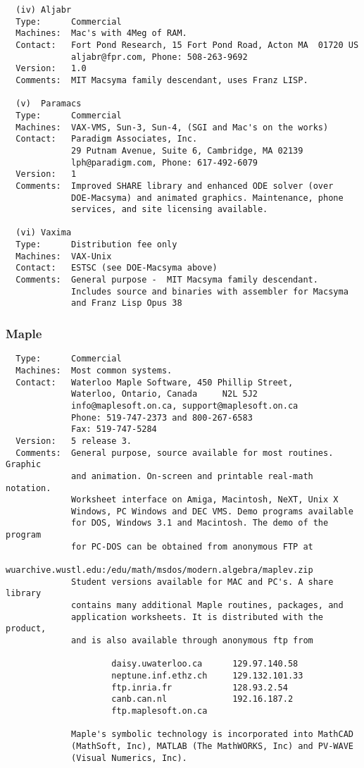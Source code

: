 \begin{verbatim}
  (iv) Aljabr
  Type:      Commercial
  Machines:  Mac's with 4Meg of RAM.
  Contact:   Fort Pond Research, 15 Fort Pond Road, Acton MA  01720 US
             aljabr@fpr.com, Phone: 508-263-9692
  Version:   1.0
  Comments:  MIT Macsyma family descendant, uses Franz LISP.

  (v)  Paramacs
  Type:      Commercial
  Machines:  VAX-VMS, Sun-3, Sun-4, (SGI and Mac's on the works)
  Contact:   Paradigm Associates, Inc.
             29 Putnam Avenue, Suite 6, Cambridge, MA 02139
             lph@paradigm.com, Phone: 617-492-6079
  Version:   1
  Comments:  Improved SHARE library and enhanced ODE solver (over
             DOE-Macsyma) and animated graphics. Maintenance, phone
             services, and site licensing available.

  (vi) Vaxima
  Type:      Distribution fee only
  Machines:  VAX-Unix
  Contact:   ESTSC (see DOE-Macsyma above)
  Comments:  General purpose -  MIT Macsyma family descendant.
             Includes source and binaries with assembler for Macsyma
             and Franz Lisp Opus 38
\end{verbatim}

\subsubsection{Maple}
\begin{verbatim}
  Type:      Commercial
  Machines:  Most common systems.
  Contact:   Waterloo Maple Software, 450 Phillip Street,
             Waterloo, Ontario, Canada     N2L 5J2
             info@maplesoft.on.ca, support@maplesoft.on.ca
             Phone: 519-747-2373 and 800-267-6583
             Fax: 519-747-5284
  Version:   5 release 3.
  Comments:  General purpose, source available for most routines. Graphic
             and animation. On-screen and printable real-math notation.
             Worksheet interface on Amiga, Macintosh, NeXT, Unix X
             Windows, PC Windows and DEC VMS. Demo programs available
             for DOS, Windows 3.1 and Macintosh. The demo of the program
             for PC-DOS can be obtained from anonymous FTP at
             wuarchive.wustl.edu:/edu/math/msdos/modern.algebra/maplev.zip
             Student versions available for MAC and PC's. A share library
             contains many additional Maple routines, packages, and
             application worksheets. It is distributed with the product,
             and is also available through anonymous ftp from

                     daisy.uwaterloo.ca      129.97.140.58
                     neptune.inf.ethz.ch     129.132.101.33
                     ftp.inria.fr            128.93.2.54
                     canb.can.nl             192.16.187.2
                     ftp.maplesoft.on.ca

             Maple's symbolic technology is incorporated into MathCAD
             (MathSoft, Inc), MATLAB (The MathWORKS, Inc) and PV-WAVE
             (Visual Numerics, Inc).
\end{verbatim}

